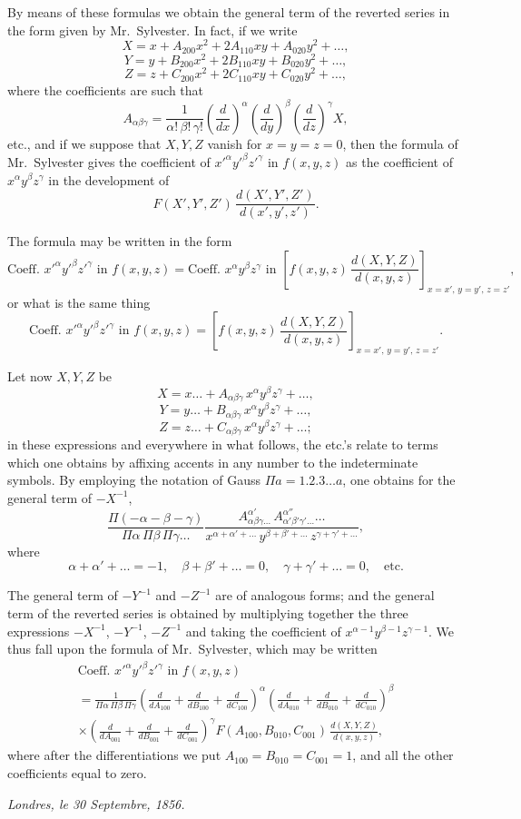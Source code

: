 \documentclass[11pt]{article}
\begin{document}
By means of these formulas we obtain the general term of the reverted series in the form given by Mr.~Sylvester. In fact, if we write
\[
X = x + A_{200}x^2 + 2A_{110}xy + A_{020}y^2 + \ldots,
\]
\[
Y = y + B_{200}x^2 + 2B_{110}xy + B_{020}y^2 + \ldots,
\]
\[
Z = z + C_{200}x^2 + 2C_{110}xy + C_{020}y^2 + \ldots,
\]
where the coefficients are such that
\[
A_{\alpha\beta\gamma} = \frac{1}{\alpha!\,\beta!\,\gamma!}
\left(\frac{d}{dx}\right)^\alpha
\left(\frac{d}{dy}\right)^\beta
\left(\frac{d}{dz}\right)^\gamma X,
\]
etc., and if we suppose that $X,Y,Z$ vanish for $x=y=z=0$, then the formula of Mr.~Sylvester gives the coefficient of $x'^\alpha y'^\beta z'^\gamma$ in $f(x,y,z)$ as the coefficient of $x^\alpha y^\beta z^\gamma$ in the development of
\[
F(X',Y',Z')\,\frac{d(X',Y',Z')}{d(x',y',z')}.
\]

The formula may be written in the form
\[
\text{Coeff. } x'^\alpha y'^\beta z'^\gamma \text{ in } f(x,y,z)
= \text{Coeff. } x^\alpha y^\beta z^\gamma \text{ in }
\left[ f(x,y,z)\,\frac{d(X,Y,Z)}{d(x,y,z)} \right]_{x=x',\,y=y',\,z=z'},
\]
or what is the same thing
\[
\text{Coeff. } x'^\alpha y'^\beta z'^\gamma \text{ in } f(x,y,z)
= \left[ f(x,y,z)\,\frac{d(X,Y,Z)}{d(x,y,z)} \right]_{x=x',\,y=y',\,z=z'}.
\]

Let now $X,Y,Z$ be
\[
X = x\ldots + A_{\alpha\beta\gamma}\,x^\alpha y^\beta z^\gamma + \ldots,
\]
\[
Y = y\ldots + B_{\alpha\beta\gamma}\,x^\alpha y^\beta z^\gamma + \ldots,
\]
\[
Z = z\ldots + C_{\alpha\beta\gamma}\,x^\alpha y^\beta z^\gamma + \ldots;
\]
in these expressions and everywhere in what follows, the etc.'s relate to terms which one obtains by affixing accents in any number to the indeterminate symbols. By employing the notation of Gauss $\Pi a = 1.2.3\ldots a$, one obtains for the general term of $-X^{-1}$,
\[
\frac{\Pi(-\alpha-\beta-\gamma)}{\Pi\alpha\,\Pi\beta\,\Pi\gamma\ldots}
\frac{A_{\alpha\beta\gamma\ldots}^{\alpha'}\,A_{\alpha'\beta'\gamma'\ldots}^{\alpha''}\ldots}
{x^{\alpha+\alpha'+\ldots}\,y^{\beta+\beta'+\ldots}\,z^{\gamma+\gamma'+\ldots}},
\]
where
\[
\alpha + \alpha' + \ldots = -1, \quad
\beta + \beta' + \ldots = 0, \quad
\gamma + \gamma' + \ldots = 0, \quad \text{etc.}
\]

The general term of $-Y^{-1}$ and $-Z^{-1}$ are of analogous forms; and the general term of the reverted series is obtained by multiplying together the three expressions $-X^{-1}$, $-Y^{-1}$, $-Z^{-1}$ and taking the coefficient of $x^{\alpha-1}y^{\beta-1}z^{\gamma-1}$. We thus fall upon the formula of Mr.~Sylvester, which may be written
\begin{multline*}
\text{Coeff. } x'^\alpha y'^\beta z'^\gamma \text{ in } f(x,y,z) \\
= \frac{1}{\Pi\alpha\,\Pi\beta\,\Pi\gamma}
\left(
\frac{d}{dA_{100}} + \frac{d}{dB_{100}} + \frac{d}{dC_{100}}
\right)^\alpha
\left(
\frac{d}{dA_{010}} + \frac{d}{dB_{010}} + \frac{d}{dC_{010}}
\right)^\beta \\
\times\left(
\frac{d}{dA_{001}} + \frac{d}{dB_{001}} + \frac{d}{dC_{001}}
\right)^\gamma
F(A_{100},B_{010},C_{001})\,\frac{d(X,Y,Z)}{d(x,y,z)},
\end{multline*}
where after the differentiations we put $A_{100}=B_{010}=C_{001}=1$, and all the other coefficients equal to zero.

\bigskip
\noindent\textit{Londres, le 30 Septembre, 1856.}
\end{document}
